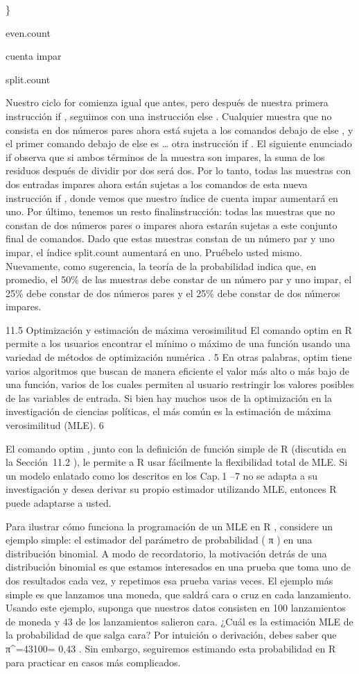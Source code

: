 \documentclass[
]{book}
\begin{document}
\}

even.count

cuenta impar

split.count

Nuestro ciclo for comienza igual que antes, pero después de nuestra primera instrucción if , seguimos con una instrucción else . Cualquier muestra que no consista en dos números pares ahora está sujeta a los comandos debajo de else , y el primer comando debajo de else es \ldots{} otra instrucción if . El siguiente enunciado if observa que si ambos términos de la muestra son impares, la suma de los residuos después de dividir por dos será dos. Por lo tanto, todas las muestras con dos entradas impares ahora están sujetas a los comandos de esta nueva instrucción if , donde vemos que nuestro índice de cuenta impar aumentará en uno. Por último, tenemos un resto finalinstrucción: todas las muestras que no constan de dos números pares o impares ahora estarán sujetas a este conjunto final de comandos. Dado que estas muestras constan de un número par y uno impar, el índice split.count aumentará en uno. Pruébelo usted mismo. Nuevamente, como sugerencia, la teoría de la probabilidad indica que, en promedio, el 50\% de las muestras debe constar de un número par y uno impar, el 25\% debe constar de dos números pares y el 25\% debe constar de dos números impares.

11.5 Optimización y estimación de máxima verosimilitud
El comando optim en R permite a los usuarios encontrar el mínimo o máximo de una función usando una variedad de métodos de optimización numérica . 5 En otras palabras, optim tiene varios algoritmos que buscan de manera eficiente el valor más alto o más bajo de una función, varios de los cuales permiten al usuario restringir los valores posibles de las variables de entrada. Si bien hay muchos usos de la optimización en la investigación de ciencias políticas, el más común es la estimación de máxima verosimilitud (MLE). 6

El comando optim , junto con la definición de función simple de R (discutida en la Sección  11.2 ), le permite a R usar fácilmente la flexibilidad total de MLE. Si un modelo enlatado como los descritos en los Cap. 1 --7 no se adapta a su investigación y desea derivar su propio estimador utilizando MLE, entonces R puede adaptarse a usted.

Para ilustrar cómo funciona la programación de un MLE en R , considere un ejemplo simple: el estimador del parámetro de probabilidad ( π ) en una distribución binomial. A modo de recordatorio, la motivación detrás de una distribución binomial es que estamos interesados \hspace{0pt}\hspace{0pt}en una prueba que toma uno de dos resultados cada vez, y repetimos esa prueba varias veces. El ejemplo más simple es que lanzamos una moneda, que saldrá cara o cruz en cada lanzamiento. Usando este ejemplo, suponga que nuestros datos consisten en 100 lanzamientos de moneda y 43 de los lanzamientos salieron cara. ¿Cuál es la estimación MLE de la probabilidad de que salga cara? Por intuición o derivación, debes saber que π\^{}=43100= 0,43 . Sin embargo, seguiremos estimando esta probabilidad en R para practicar en casos más complicados.
\end{document}
